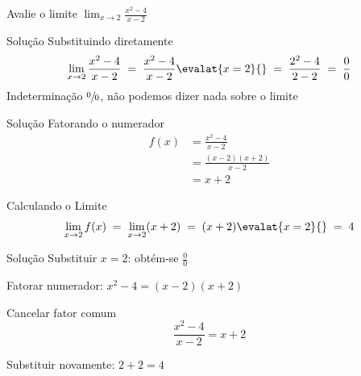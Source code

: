 \begin{question}
  Avalie o limite
  \(
    \lim_{x \to 2} \frac{x^2 - 4}{x-2}
  \)
\end{question}

\begin{resolution}{Solução}
  Substituindo diretamente
  \[
    \lim_{x \to 2} \frac{x^2 - 4}{x-2}
    \;=\; \frac{x^2 - 4}{x-2} \evalat{x=2}{}
    \;=\; \frac{2^2 - 4}{2-2}
    \;=\; \frac{0}{0}
  \]
  Indeterminação \(\sfrac{0}{0}\), não podemos dizer nada sobre o limite
\end{resolution}

\begin{resolution}{Solução}
  Fatorando o numerador
  \begin{align*}
    f(x)
    & = \frac{x^2 - 4}{x-2} \\
    & = \frac{(x-2)(x+2)}{x-2} \\
    & = x+2
  \end{align*}

  Calculando o Limite
  \[
    \lim_{x \to 2} f(x)
    \;=\; \lim_{x \to 2} (x+2)
    \;=\; (x+2) \evalat{x=2}{}
    \;=\; 4
  \]
\end{resolution}

\begin{resolution}{Solução}
  Substituir $x=2$: obtém-se $\frac{0}{0}$

  Fatorar numerador: $x^2-4 = (x-2)(x+2)$

  Cancelar fator comum
  \[
    \frac{x^2-4}{x-2} = x+2
  \]

  Substituir novamente: $2+2=4$
\end{resolution}

